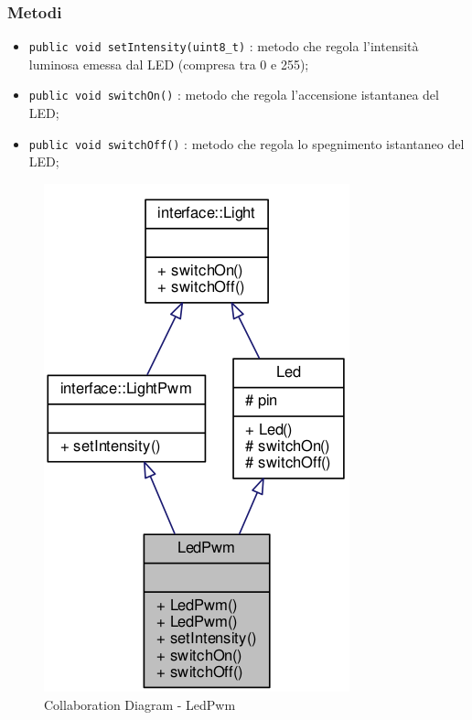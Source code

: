 \subsubsection{Metodi}
\begin{itemize}
	\item \texttt{public void setIntensity(uint8\_t)} : metodo che regola l'intensità luminosa emessa dal LED (compresa tra 0 e 255);
	\item \texttt{public void switchOn()} : metodo che regola l'accensione istantanea del LED;
	\item \texttt{public void switchOff()} : metodo che regola lo spegnimento istantaneo del LED;
\end{itemize}
\begin{figure}[!ht]
	\centering
	\includegraphics[scale=.4]{img/UML/CollaborationDiagram/LedPwm.png}
	\caption{Collaboration Diagram - LedPwm}
\end{figure}

